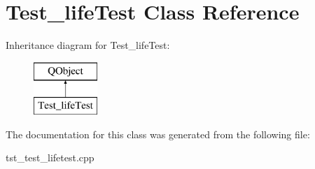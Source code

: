 \hypertarget{class_test__life_test}{}\section{Test\+\_\+life\+Test Class Reference}
\label{class_test__life_test}
Inheritance diagram for Test\+\_\+life\+Test\+:\begin{figure}[H]
\begin{center}
\leavevmode
\includegraphics[height=2.000000cm]{class_test__life_test}
\end{center}
\end{figure}


The documentation for this class was generated from the following file\+:\begin{DoxyCompactItemize}
\item 
tst\+\_\+test\+\_\+lifetest.\+cpp\end{DoxyCompactItemize}
